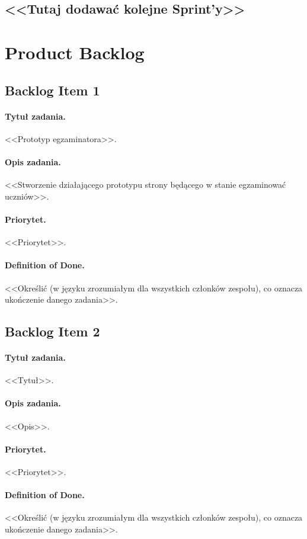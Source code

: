 \documentclass[a4paper]{article}
\begin{document}
\subsection*{<<Tutaj dodawać kolejne Sprint'y>>}

\section{Product Backlog}

\subsection{Backlog Item 1}
\paragraph{Tytuł zadania.} <<Prototyp egzaminatora>>.
\paragraph{Opis zadania.} <<Stworzenie działającego prototypu strony będącego w stanie egzaminować uczniów>>.
\paragraph{Priorytet.} <<Priorytet>>.
\paragraph{Definition of Done.} <<Określić (w języku zrozumiałym dla wszystkich członków zespołu), co oznacza ukończenie danego zadania>>.

\subsection{Backlog Item 2}
\paragraph{Tytuł zadania.} <<Tytuł>>.
\paragraph{Opis zadania.} <<Opis>>.
\paragraph{Priorytet.} <<Priorytet>>.
\paragraph{Definition of Done.} <<Określić (w języku zrozumiałym dla wszystkich członków zespołu), co oznacza ukończenie danego zadania>>.
\end{document}

